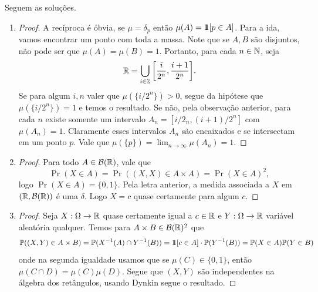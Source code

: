 Seguem as soluções.
\begin{enumerate}[label=(\alph*)]
	\item
		\begin{proof}
			A recíproca é óbvia, se $\mu = \delta_p$ então $\mu(A) = \hbox{$1\mkern-6.5mu1$}[p \in
			A]$. Para a ida, vamos encontrar
			um ponto com toda a massa. Note que se $A,B$ são disjuntos, não
			pode ser que $\mu(A) = \mu(B) = 1$.
			Portanto, para cada $n \in \mathbb{N}$, seja
			\[
				\mathbb{R} = \bigcup_{i \in \mathbb{Z}} \bigg[\frac{i}{2^n}, \frac{i+1}{2^n}\bigg].
			\]
			Se para algum $i,n$ valer que $\mu(\{i/2^n\}) > 0$, segue da
			hipótese que $\mu(\{i/2^n\}) = 1$ e temos o resultado. Se não,
			pela observação anterior, para cada $n$ existe somente um
			intervalo $A_n = [i/2_n, (i+1)/2^n]$
			com $\mu(A_n) = 1$. Claramente esses intervalos $A_n$ são
			encaixados e se intersectam em um ponto $p$.
			Vale que $\mu(\{p\}) = \lim_{n\to\infty} \mu(A_n) = 1$.
		\end{proof}

	\item
		\begin{proof}
			Para todo $A \in \mathcal{B}(\mathbb{R})$, vale que
			\[
				\Pr(X \in A) = \Pr((X,X) \in A \times A) = \Pr(X \in A)^2,
			\]
			logo $\Pr(X \in A) = \{0,1\}$. Pela letra anterior,
			a medida associada a $X$ em $(\mathbb{R}, \mathcal{B}(\mathbb{R}))$ é uma $\delta$.
			Logo $X = c$ quase certamente
			para algum $c$.
		\end{proof}

	\item
		\begin{proof}
			Seja $X: \Omega \rightarrow \mathbb{R}$ quase certamente igual a $c \in \mathbb{R}$ e $Y:
			\Omega \rightarrow \mathbb{R}$ variável aleatória qualquer.
			Temos para $A \times B \in \mathcal{B}(\mathbb{R})^2$ que
			\[
				\mathbb{P}((X,Y) \in A \times B) = \mathbb{P}(X^{-1}(A) \cap Y^{-1}(B)) = \hbox{$1\mkern-6.5mu1$}[c
				\in A] \cdot \mathbb{P}(Y^{-1}(B)) = \mathbb{P}(X \in A) \mathbb{P}(Y \in B)
			\]
			onde na segunda igualdade usamos que se $\mu(C) \in \{0,1\}$,
			então $\mu(C \cap D) = \mu(C)\mu(D)$. Segue
			que $(X,Y)$ são independentes na álgebra dos retângulos, usando
			Dynkin segue o resultado.
		\end{proof}


\end{enumerate}

